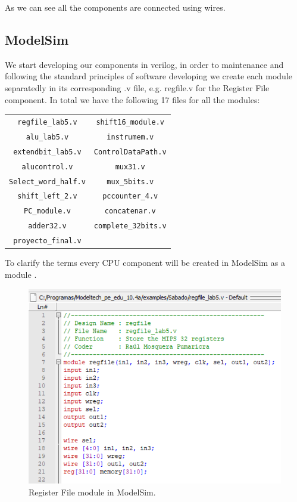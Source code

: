 \documentclass[conference]{IEEEtran}
\begin{document}
As we can see all the components are connected using wires.
\subsection{ModelSim}
We start developing our components in verilog, in order to maintenance and following the
standard principles of software developing  we create each module separatedly in its corresponding
.v file, e.g. regfile.v for the Register File component.
In total we have the following 17 files for all the modules:

\begin{table}[htbp]
\begin{center}
\begin{tabular}{c c}
\verb$regfile_lab5.v$&\verb$shift16_module.v$\\
\verb$alu_lab5.v$&\verb$instrumem.v$\\
\verb$extendbit_lab5.v$&\verb$ControlDataPath.v$\\
\verb$alucontrol.v$&\verb$mux31.v$\\
\verb$Select_word_half.v$&\verb$mux_5bits.v$\\
\verb$shift_left_2.v$&\verb$pccounter_4.v$\\
\verb$PC_module.v$&\verb$concatenar.v$\\
\verb$adder32.v$&\verb$complete_32bits.v$\\
\verb$proyecto_final.v$&\\
\end{tabular}
\end{center}
\end{table}

To clarify the terms every CPU component will be created in ModelSim as a module \cite{b4}.

\begin{figure}[htbp]
\centerline{\includegraphics[scale=0.7]{modelsim_module.png}}
\caption{Register File module in ModelSim.}
\label{fig}
\end{figure}
\end{document}
